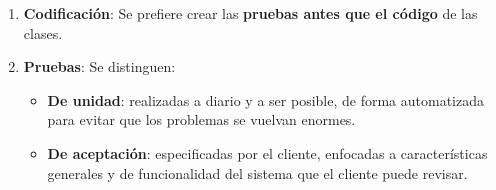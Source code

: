 \begin{enumerate}
   \item \textbf{Codificación}: Se prefiere crear las \textbf{pruebas antes que el código} de las clases.
   
   \item \textbf{Pruebas}: Se distinguen:
   \begin{itemize}
      \item \textbf{De unidad}: realizadas a diario y a ser posible, de forma automatizada para evitar que los problemas se vuelvan enormes.
      \item \textbf{De aceptación}: especificadas por el cliente, enfocadas a características generales y de funcionalidad del sistema que el cliente puede revisar. %
   \end{itemize}
\end{enumerate}
